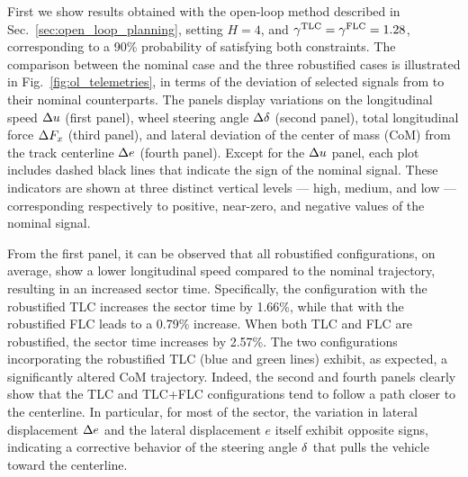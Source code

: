 First we show results obtained with the open-loop method described in Sec.~\ref{sec:open_loop_planning}, setting $H=4$, and $\gamma^\textrm{TLC}=\gamma^\textrm{FLC}=1.28$, corresponding to a 90\% probability of satisfying both constraints.
The comparison between the nominal case and the three robustified cases is illustrated in Fig.~\ref{fig:ol_telemetries}, in terms of the deviation of selected signals from to their nominal counterparts.
The panels display variations on the longitudinal speed $\Delta u$ (first panel), wheel steering angle $\Delta \delta$ (second panel), total longitudinal force $\Delta F_x$ (third panel), and lateral deviation of the center of mass (CoM) from the track centerline $\Delta e$ (fourth panel).
Except for the $\Delta u$ panel, each plot includes dashed black lines that indicate the sign of the nominal signal.
These indicators are shown at three distinct vertical levels --- high, medium, and low --- corresponding respectively to positive, near-zero, and negative values of the nominal signal.


From the first panel, it can be observed that all robustified configurations, on average, show a lower longitudinal speed compared to the nominal trajectory, resulting in an increased sector time. Specifically, the configuration with the robustified TLC increases the sector time by 1.66\%, while that with the robustified FLC leads to a 0.79\% increase. When both TLC and FLC are robustified, the sector time increases by 2.57\%.
The two configurations incorporating the robustified TLC (blue and green lines) exhibit, as expected, a significantly altered CoM trajectory.
Indeed, the second and fourth panels clearly show that the TLC and TLC+FLC configurations tend to follow a path closer to the centerline. In particular, for most of the sector, the variation in lateral displacement $\Delta e$ and the lateral displacement $e$ itself exhibit opposite signs, indicating a corrective behavior of the steering angle $\delta$ that pulls the vehicle toward the centerline.


